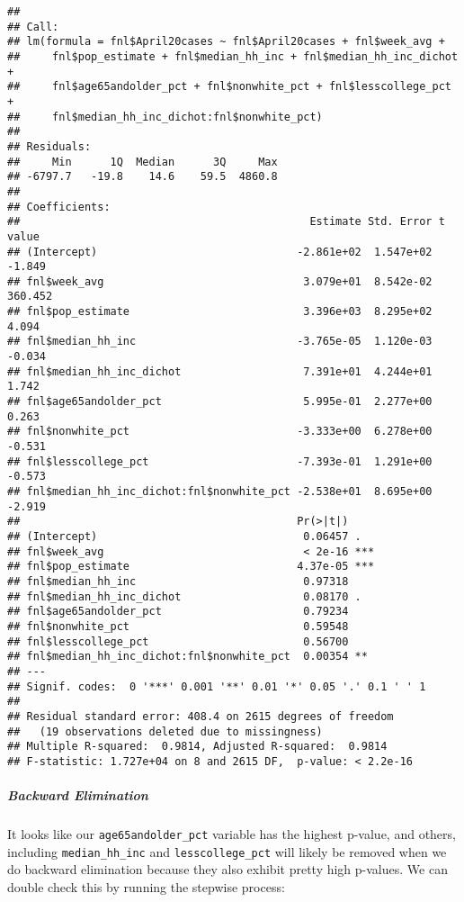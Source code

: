 \documentclass[
]{article}
\begin{document}
\begin{verbatim}
## 
## Call:
## lm(formula = fnl$April20cases ~ fnl$April20cases + fnl$week_avg + 
##     fnl$pop_estimate + fnl$median_hh_inc + fnl$median_hh_inc_dichot + 
##     fnl$age65andolder_pct + fnl$nonwhite_pct + fnl$lesscollege_pct + 
##     fnl$median_hh_inc_dichot:fnl$nonwhite_pct)
## 
## Residuals:
##     Min      1Q  Median      3Q     Max 
## -6797.7   -19.8    14.6    59.5  4860.8 
## 
## Coefficients:
##                                             Estimate Std. Error t value
## (Intercept)                               -2.861e+02  1.547e+02  -1.849
## fnl$week_avg                               3.079e+01  8.542e-02 360.452
## fnl$pop_estimate                           3.396e+03  8.295e+02   4.094
## fnl$median_hh_inc                         -3.765e-05  1.120e-03  -0.034
## fnl$median_hh_inc_dichot                   7.391e+01  4.244e+01   1.742
## fnl$age65andolder_pct                      5.995e-01  2.277e+00   0.263
## fnl$nonwhite_pct                          -3.333e+00  6.278e+00  -0.531
## fnl$lesscollege_pct                       -7.393e-01  1.291e+00  -0.573
## fnl$median_hh_inc_dichot:fnl$nonwhite_pct -2.538e+01  8.695e+00  -2.919
##                                           Pr(>|t|)    
## (Intercept)                                0.06457 .  
## fnl$week_avg                               < 2e-16 ***
## fnl$pop_estimate                          4.37e-05 ***
## fnl$median_hh_inc                          0.97318    
## fnl$median_hh_inc_dichot                   0.08170 .  
## fnl$age65andolder_pct                      0.79234    
## fnl$nonwhite_pct                           0.59548    
## fnl$lesscollege_pct                        0.56700    
## fnl$median_hh_inc_dichot:fnl$nonwhite_pct  0.00354 ** 
## ---
## Signif. codes:  0 '***' 0.001 '**' 0.01 '*' 0.05 '.' 0.1 ' ' 1
## 
## Residual standard error: 408.4 on 2615 degrees of freedom
##   (19 observations deleted due to missingness)
## Multiple R-squared:  0.9814, Adjusted R-squared:  0.9814 
## F-statistic: 1.727e+04 on 8 and 2615 DF,  p-value: < 2.2e-16
\end{verbatim}

\hypertarget{backward-elimination}{%
\subparagraph{Backward Elimination}\label{backward-elimination}}

It looks like our \texttt{age65andolder\_pct} variable has the highest
p-value, and others, including \texttt{median\_hh\_inc} and
\texttt{lesscollege\_pct} will likely be removed when we do backward
elimination because they also exhibit pretty high p-values. We can
double check this by running the stepwise process:
\end{document}

